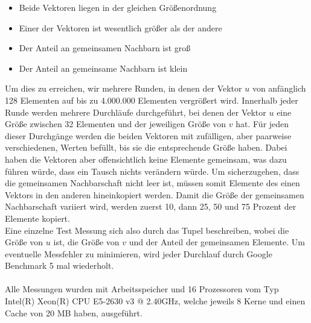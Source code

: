 \begin{itemize}
	\item Beide Vektoren liegen in der gleichen Größenordnung
	
	\item Einer der Vektoren ist wesentlich größer als der andere
	
	\item Der Anteil an gemeinsamen Nachbarn ist groß
	
	\item Der Anteil an gemeinsame Nachbarn  ist klein
\end{itemize}
Um dies zu erreichen,  wir mehrere Runden, in denen der Vektor $u$ von anfänglich 128
Elementen auf bis zu 4.000.000 Elementen vergrößert wird. Innerhalb jeder Runde werden mehrere Durchläufe 
durchgeführt, bei denen der Vektor $u$ eine Größe zwischen 32 Elementen und der jeweiligen Größe von $v$ hat.
Für jeden dieser Durchgänge werden die beiden Vektoren mit zufälligen, aber paarweise verschiedenen,
Werten befüllt, bis sie die entsprechende Größe haben. 
Dabei haben die Vektoren aber offensichtlich keine Elemente gemeinsam, was dazu führen würde, dass ein \gc 
Tausch nichts verändern würde. Um sicherzugehen,
dass die gemeinsamen Nachbarschaft nicht leer ist, müssen somit Elemente des einen Vektors 
in den anderen hineinkopiert werden. Damit die Größe der gemeinsamen Nachbarschaft
variiert wird, werden zuerst 10, dann 25, 50 und 75 Prozent der Elemente kopiert. 
\\
Eine einzelne Test Messung sich also durch das Tupel  beschreiben, wobei
\fett{\la} die Größe von $u$ ist, \fett{\sm} die Größe von $v$ und \fett{\fr} der Anteil der gemeinsamen Elemente.
Um eventuelle Messfehler zu minimieren, wird jeder Durchlauf durch Google Benchmark 5 mal wiederholt.
\\
\\
Alle Messungen wurden  mit  Arbeitsspeicher und 16 Prozessoren vom Typ Intel(R) Xeon(R) CPU E5-2630 v3 @ 2.40GHz,
welche jeweils 8 Kerne und einen Cache von 20 MB haben, ausgeführt.
\
\\
\\
\\
\\
\\

